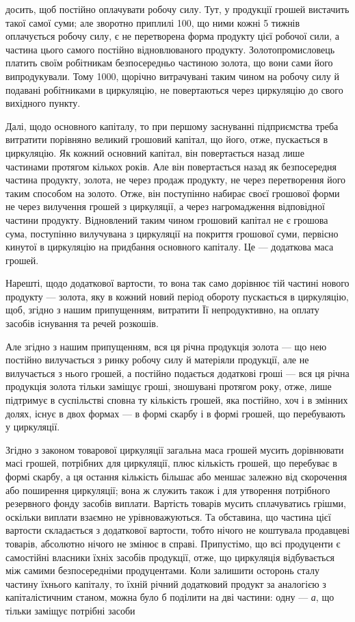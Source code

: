 \parcont{}  %
досить, щоб постійно оплачувати робочу силу. Тут, у продукції грошей
вистачить такої самої суми; але зворотно приплилі 100, що ними
кожні 5 тижнів оплачується робочу силу, є не перетворена форма продукту
цієї робочої сили, а частина цього самого постійно відновлюваного
продукту. Золотопромисловець платить своїм робітникам безпосередньо
частиною золота, що вони сами його випродукували. Тому 1000,
щорічно витрачувані таким чином на робочу силу й подавані робітниками
в циркуляцію, не повертаються через циркуляцію до свого вихідного
пункту.

Далі, щодо основного капіталу, то при першому заснуванні підприємства
треба витратити порівняно великий грошовий капітал, що його,
отже, пускається в циркуляцію. Як кожний основний капітал, він повертається
назад лише частинами протягом кількох років. Але він повертається
назад як безпосередня частина продукту, золота, не через продаж
продукту, не через перетворення його таким способом на золото. Отже,
він поступінно набирає своєї грошової форми не через вилучення грошей
з циркуляції, а через нагромадження відповідної частини продукту.
Відновлений таким чином грошовий капітал не є грошова сума, поступінно
вилучувана з циркуляції на покриття грошової суми, первісно кинутої
в циркуляцію на придбання основного капіталу. Це — додаткова
маса грошей.

Нарешті, щодо додаткової вартости, то вона так само дорівнює тій
частині нового продукту — золота, яку в кожний новий період обороту
пускається в циркуляцію, щоб, згідно з нашим припущенням, витратити
Її непродуктивно, на оплату засобів існування та речей розкошів.

Але згідно з нашим припущенням, вся ця річна продукція золота —
що нею постійно вилучається з ринку робочу силу й матеріяли продукції,
але не вилучається з нього грошей, а постійно подається додаткові гроші
— вся ця річна продукція золота тільки заміщує гроші, зношувані протягом
року, отже, лише підтримує в суспільстві сповна ту кількість грошей,
яка постійно, хоч і в змінних долях, існує в двох формах — в формі
скарбу і в формі грошей, що перебувають у циркуляції.

Згідно з законом товарової циркуляції загальна маса грошей мусить
дорівнювати масі грошей, потрібних для циркуляції, плюс кількість грошей,
що перебуває в формі скарбу, а ця остання кількість більшає або
меншає залежно від скорочення або поширення циркуляції; вона ж служить
також і для утворення потрібного резервного фонду засобів виплати.
Вартість товарів мусить сплачуватись грішми, оскільки виплати
взаємно не урівноважуються. Та обставина, що частина цієї вартости
складається з додаткової вартости, тобто нічого не коштувала продавцеві
товарів, абсолютно нічого не змінює в справі. Припустімо, що всі
продуценти є самостійні власники їхніх засобів продукції, отже, що циркуляція
відбувається між самими безпосередніми продуцентами. Коли залишити
осторонь сталу частину їхнього капіталу, то їхній річний додатковий
продукт за аналогією з капіталістичним станом, можна було б поділити
на дві частини: одну — \emph{а}, що тільки заміщує потрібні засоби
\parbreak{}  %

